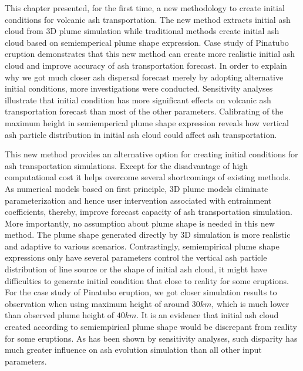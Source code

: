 This chapter presented, for the first time, a new methodology to create initial conditions for volcanic ash transportation. The new method extracts initial ash cloud from 3D plume simulation while traditional methods create initial ash cloud based on semiemperical plume shape expression. Case study of Pinatubo eruption demonstrates that this new method can create more realistic initial ash cloud and improve accuracy of ash transportation forecast. In order to explain why we got much closer ash dispersal forecast merely by adopting alternative initial conditions, more investigations were conducted. Sensitivity analyses illustrate that initial condition has more significant effects on volcanic ash transportation forecast than most of the other parameters. Calibrating of the maximum height in semiemperical plume shape expression reveals how vertical ash particle distribution in initial ash cloud could affect ash transportation. 

This new method provides an alternative option for creating initial conditions for ash transportation simulations. Except for the disadvantage of high computational cost it helps overcome several shortcomings of existing methods.
As numerical models based on first principle, 3D plume models eliminate parameterization and hence user intervention associated with entrainment coefficients, thereby, improve forecast capacity of ash transportation simulation. More importantly, no assumption about plume shape is needed in this new method. The plume shape generated directly by 3D simulation is more realistic and adaptive to various scenarios.
Contrastingly, semiempirical plume shape expressions only have several parameters control the vertical ash particle distribution of line source or the shape of initial ash cloud, it might have difficulties to generate initial condition that close to reality for some eruptions.
For the case study of Pinatubo eruption, we got closer simulation results to observation when using maximum height of around $30 km$, which is much lower than observed plume height of $40 km$. It is an evidence that initial ash cloud created according to semiempirical plume shape would be discrepant from reality for some eruptions. As has been shown by sensitivity analyses, such disparity has much greater influence on ash evolution simulation than all other input parameters.

